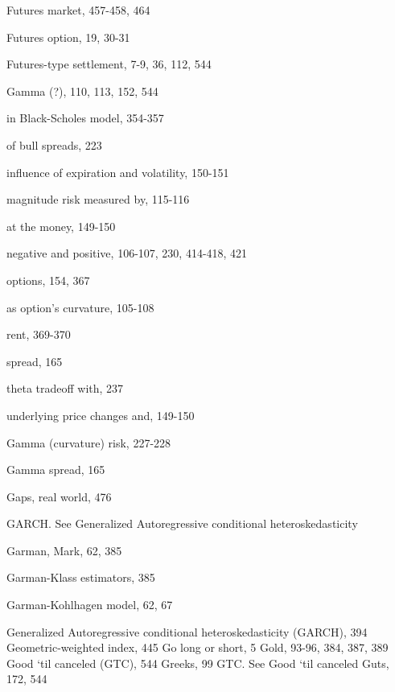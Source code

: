 \noindent Futures market, 457-458, 464\par
\noindent Futures option, 19, 30-31\par
\noindent Futures-type settlement, 7-9, 36, 112, 544\par
\noindent Gamma (?), 110, 113, 152, 544\par
\noindent in Black-Scholes model, 354-357\par
\noindent of bull spreads, 223\par
\noindent influence of expiration and volatility, 150-151\par
\noindent magnitude risk measured by, 115-116\par
\noindent at the money, 149-150\par
\noindent negative and positive, 106-107, 230, 414-418, 421\par
\noindent options, 154, 367\par
\noindent as option's curvature, 105-108\par
\noindent rent, 369-370\par
\noindent spread, 165\par
\noindent theta tradeoff with, 237\par
\noindent underlying price changes and, 149-150\par
\noindent Gamma (curvature) risk, 227-228\par
\noindent Gamma spread, 165\par
\noindent Gaps, real world, 476\par
GARCH. See Generalized Autoregressive conditional heteroskedasticity\par
\noindent Garman, Mark, 62, 385\par
\noindent Garman-Klass estimators, 385\par
\noindent Garman-Kohlhagen model, 62, 67\par
Generalized Autoregressive conditional heteroskedasticity (GARCH), 394 Geometric-weighted index, 445 Go long or short, 5 Gold, 93-96, 384, 387, 389 Good `til canceled (GTC), 544 Greeks, 99 GTC. See Good `til canceled Guts, 172, 544\par

